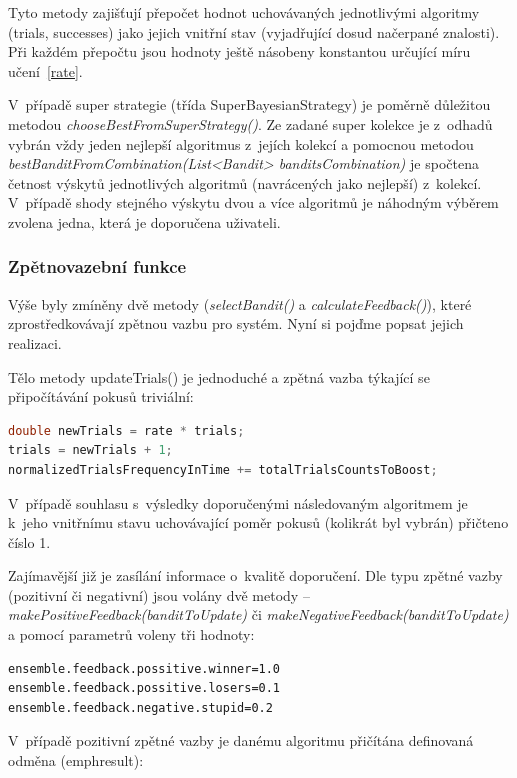 \documentclass[thesis=M,czech]{FITthesis}[2014/05/07]
\begin{document}
Tyto metody zajišťují přepočet hodnot uchovávaných jednotlivými algoritmy (trials, successes) jako jejich vnitřní stav (vyjadřující dosud načerpané znalosti). Při každém přepočtu jsou hodnoty ještě násobeny konstantou určující míru učení~\ref{rate}.
    
V~případě super strategie (třída SuperBayesianStrategy) je poměrně důležitou metodou \emph{chooseBestFromSuperStrategy()}. Ze zadané super kolekce je z~odhadů vybrán vždy jeden nejlepší algoritmus z~jejích kolekcí a pomocnou metodou \emph{bestBanditFromCombination(List<Bandit> banditsCombination)} je spočtena četnost výskytů jednotlivých algoritmů (navrácených jako nejlepší) z~kolekcí. V~případě shody stejného výskytu dvou a více algoritmů je náhodným výběrem zvolena jedna, která je doporučena uživateli.
    
\subsubsection{Zpětnovazební funkce}
\label{implfeedback}     
Výše byly zmíněny dvě metody (\emph{selectBandit()} a \emph{calculateFeedback()}), které zprostředkovávají zpětnou vazbu pro systém. Nyní si pojďme popsat jejich realizaci.

Tělo metody updateTrials() je jednoduché a zpětná vazba týkající se připočítávání pokusů triviální:

\begin{lstlisting}[language=java]
double newTrials = rate * trials;
trials = newTrials + 1;
normalizedTrialsFrequencyInTime += totalTrialsCountsToBoost;
\end{lstlisting}	

V~případě souhlasu s~výsledky doporučenými následovaným algoritmem je k~jeho vnitřnímu stavu uchovávající poměr pokusů (kolikrát byl vybrán) přičteno číslo 1.

Zajímavější již je zasílání informace o~kvalitě doporučení. Dle typu zpětné vazby (pozitivní či negativní) jsou volány dvě metody – \emph{makePositiveFeedback(banditToUpdate)} či \emph{makeNegativeFeedback(banditToUpdate)} a pomocí parametrů voleny tři hodnoty:

\begin{verbatim}
ensemble.feedback.possitive.winner=1.0
ensemble.feedback.possitive.losers=0.1
ensemble.feedback.negative.stupid=0.2
\end{verbatim}

V~případě pozitivní zpětné vazby je danému algoritmu přičítána definovaná odměna (emph{result}):
\end{document}
